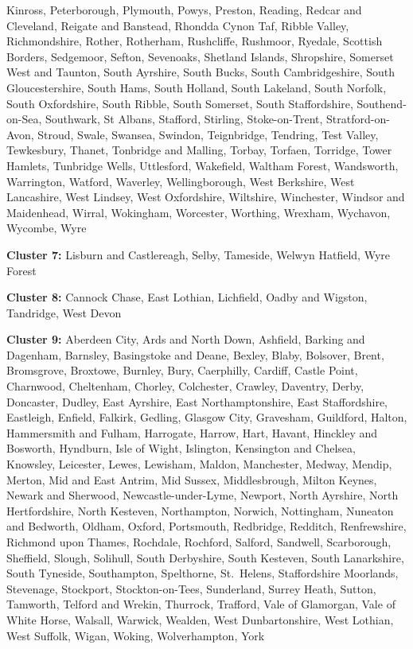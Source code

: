 \documentclass[]{interact}
\theoremstyle{plain}%
\theoremstyle{definition}
\theoremstyle{remark}
\begin{document}
Kinross, Peterborough, Plymouth, Powys, Preston, Reading, Redcar and
Cleveland, Reigate and Banstead, Rhondda Cynon Taf, Ribble Valley,
Richmondshire, Rother, Rotherham, Rushcliffe, Rushmoor, Ryedale,
Scottish Borders, Sedgemoor, Sefton, Sevenoaks, Shetland Islands,
Shropshire, Somerset West and Taunton, South Ayrshire, South Bucks,
South Cambridgeshire, South Gloucestershire, South Hams, South Holland,
South Lakeland, South Norfolk, South Oxfordshire, South Ribble, South
Somerset, South Staffordshire, Southend-on-Sea, Southwark, St Albans,
Stafford, Stirling, Stoke-on-Trent, Stratford-on-Avon, Stroud, Swale,
Swansea, Swindon, Teignbridge, Tendring, Test Valley, Tewkesbury,
Thanet, Tonbridge and Malling, Torbay, Torfaen, Torridge, Tower Hamlets,
Tunbridge Wells, Uttlesford, Wakefield, Waltham Forest, Wandsworth,
Warrington, Watford, Waverley, Wellingborough, West Berkshire, West
Lancashire, West Lindsey, West Oxfordshire, Wiltshire, Winchester,
Windsor and Maidenhead, Wirral, Wokingham, Worcester, Worthing, Wrexham,
Wychavon, Wycombe, Wyre

\textbf{Cluster 7: } Lisburn and Castlereagh, Selby, Tameside, Welwyn
Hatfield, Wyre Forest

\textbf{Cluster 8: } Cannock Chase, East Lothian, Lichfield, Oadby and
Wigston, Tandridge, West Devon

\textbf{Cluster 9: } Aberdeen City, Ards and North Down, Ashfield,
Barking and Dagenham, Barnsley, Basingstoke and Deane, Bexley, Blaby,
Bolsover, Brent, Bromsgrove, Broxtowe, Burnley, Bury, Caerphilly,
Cardiff, Castle Point, Charnwood, Cheltenham, Chorley, Colchester,
Crawley, Daventry, Derby, Doncaster, Dudley, East Ayrshire, East
Northamptonshire, East Staffordshire, Eastleigh, Enfield, Falkirk,
Gedling, Glasgow City, Gravesham, Guildford, Halton, Hammersmith and
Fulham, Harrogate, Harrow, Hart, Havant, Hinckley and Bosworth,
Hyndburn, Isle of Wight, Islington, Kensington and Chelsea, Knowsley,
Leicester, Lewes, Lewisham, Maldon, Manchester, Medway, Mendip, Merton,
Mid and East Antrim, Mid Sussex, Middlesbrough, Milton Keynes, Newark
and Sherwood, Newcastle-under-Lyme, Newport, North Ayrshire, North
Hertfordshire, North Kesteven, Northampton, Norwich, Nottingham,
Nuneaton and Bedworth, Oldham, Oxford, Portsmouth, Redbridge, Redditch,
Renfrewshire, Richmond upon Thames, Rochdale, Rochford, Salford,
Sandwell, Scarborough, Sheffield, Slough, Solihull, South Derbyshire,
South Kesteven, South Lanarkshire, South Tyneside, Southampton,
Spelthorne, St.~Helens, Staffordshire Moorlands, Stevenage, Stockport,
Stockton-on-Tees, Sunderland, Surrey Heath, Sutton, Tamworth, Telford
and Wrekin, Thurrock, Trafford, Vale of Glamorgan, Vale of White Horse,
Walsall, Warwick, Wealden, West Dunbartonshire, West Lothian, West
Suffolk, Wigan, Woking, Wolverhampton, York
\end{document}
